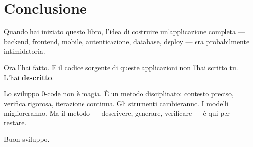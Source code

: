 \section*{Conclusione}

Quando hai iniziato questo libro, l'idea di costruire un'applicazione completa --- backend, frontend, mobile, autenticazione, database, deploy --- era probabilmente intimidatoria.

Ora l'hai fatto. E il codice sorgente di queste applicazioni non l'hai scritto tu. L'hai \textbf{descritto}.

Lo sviluppo 0-code non è magia. È un metodo disciplinato: contesto preciso, verifica rigorosa, iterazione continua. Gli strumenti cambieranno. I modelli miglioreranno. Ma il metodo --- descrivere, generare, verificare --- è qui per restare.

Buon sviluppo.

